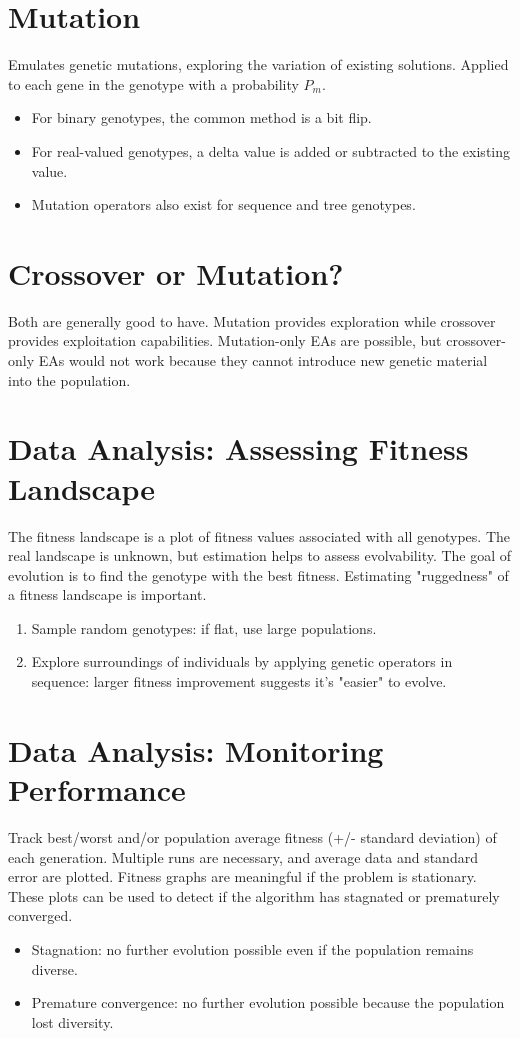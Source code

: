 \section{Mutation}
Emulates genetic mutations, exploring the variation of existing solutions. Applied to each gene in the genotype with a probability \(P_m\).
\begin{itemize}
        \item  For binary genotypes, the common method is a bit flip.
        \item  For real-valued genotypes, a delta value is added or subtracted to the existing value.
        \item  Mutation operators also exist for sequence and tree genotypes.
\end{itemize}

\section{Crossover or Mutation?}
Both are generally good to have. Mutation provides exploration while crossover provides exploitation capabilities. Mutation-only EAs are possible, but crossover-only EAs would not work because they cannot introduce new genetic material into the population.

\section{Data Analysis: Assessing Fitness Landscape}
The fitness landscape is a plot of fitness values associated with all genotypes.  The real landscape is unknown, but estimation helps to assess evolvability. The goal of evolution is to find the genotype with the best fitness. Estimating "ruggedness" of a fitness landscape is important.
\begin{enumerate}
    \item Sample random genotypes: if flat, use large populations.
    \item Explore surroundings of individuals by applying genetic operators in sequence: larger fitness improvement suggests it's "easier" to evolve.
\end{enumerate}

\section{Data Analysis: Monitoring Performance}
Track best/worst and/or population average fitness (+/- standard deviation) of each generation.
Multiple runs are necessary, and average data and standard error are plotted. Fitness graphs are meaningful if the problem is stationary. These plots can be used to detect if the algorithm has stagnated or prematurely converged.
\begin{itemize}
    \item Stagnation: no further evolution possible even if the population remains diverse.
     \item Premature convergence: no further evolution possible because the population lost diversity.
\end{itemize}

